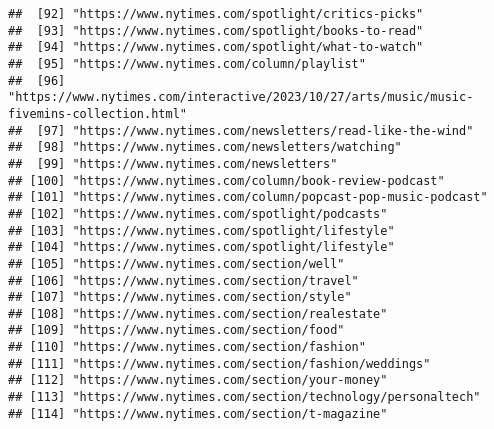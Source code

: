 \documentclass[
]{article}
\begin{document}
\begin{verbatim}
##  [92] "https://www.nytimes.com/spotlight/critics-picks"                                                           
##  [93] "https://www.nytimes.com/spotlight/books-to-read"                                                           
##  [94] "https://www.nytimes.com/spotlight/what-to-watch"                                                           
##  [95] "https://www.nytimes.com/column/playlist"                                                                   
##  [96] "https://www.nytimes.com/interactive/2023/10/27/arts/music/music-fivemins-collection.html"                  
##  [97] "https://www.nytimes.com/newsletters/read-like-the-wind"                                                    
##  [98] "https://www.nytimes.com/newsletters/watching"                                                              
##  [99] "https://www.nytimes.com/newsletters"                                                                       
## [100] "https://www.nytimes.com/column/book-review-podcast"                                                        
## [101] "https://www.nytimes.com/column/popcast-pop-music-podcast"                                                  
## [102] "https://www.nytimes.com/spotlight/podcasts"                                                                
## [103] "https://www.nytimes.com/spotlight/lifestyle"                                                               
## [104] "https://www.nytimes.com/spotlight/lifestyle"                                                               
## [105] "https://www.nytimes.com/section/well"                                                                      
## [106] "https://www.nytimes.com/section/travel"                                                                    
## [107] "https://www.nytimes.com/section/style"                                                                     
## [108] "https://www.nytimes.com/section/realestate"                                                                
## [109] "https://www.nytimes.com/section/food"                                                                      
## [110] "https://www.nytimes.com/section/fashion"                                                                   
## [111] "https://www.nytimes.com/section/fashion/weddings"                                                          
## [112] "https://www.nytimes.com/section/your-money"                                                                
## [113] "https://www.nytimes.com/section/technology/personaltech"                                                   
## [114] "https://www.nytimes.com/section/t-magazine"                                                                

\end{verbatim}
\end{document}
